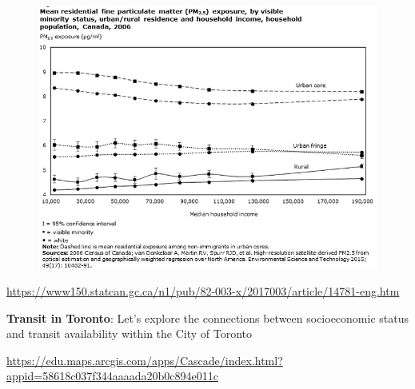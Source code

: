\documentclass[aspectratio=169]{beamer}
\begin{document}
\begin{frame}
	
	\begin{figure}
		\centering
		\includegraphics[width=0.8\linewidth]{images/race_pollution_canada.png}
	\end{figure}
	
	\tiny\url{https://www150.statcan.gc.ca/n1/pub/82-003-x/2017003/article/14781-eng.htm}
	
\end{frame}













\begin{frame}
	
	
	\textbf{Transit in Toronto}: Let's explore the connections between socioeconomic status and transit availability within the City of Toronto
	
	\vspace{2mm}
	
	
	\url{https://edu.maps.arcgis.com/apps/Cascade/index.html?appid=58618c037f344aaaada20b0c894e011c}
	
	
\end{frame}
\end{document}
